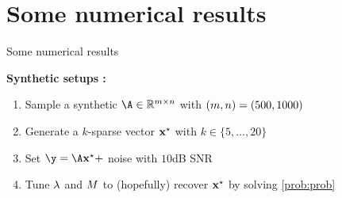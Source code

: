 \documentclass[10pt]{beamer}
\begin{document}
\section{Some numerical results}

\begin{frame}{Some numerical results}
  \newcommand{\CPLEX}{\texttt{CPLEX}}
  \newcommand{\BNB}{\texttt{BnB}}
  \newcommand{\BNBscr}{\texttt{BnB+scr}}
  \newcommand{\sparsitylevel}{k}

  \textbf{Synthetic setups :} 
  \begin{enumerate}
    \item Sample a synthetic $\dic \in \kR^{\ddim\times\pdim}$ with $(m,n)=(500,1000)$ 
    \pause
    \item Generate a $\sparsitylevel$-sparse vector $\mathbf{x}^{\star}$ with $\sparsitylevel \in \{5,\dots,20\}$
    \pause
    \item Set $\obs = \dic \opt{\pv}+$ noise with $10$dB SNR
    \pause
    \item Tune $\lambda$ and $M$ to (hopefully) recover $\mathbf{x}^{\star}$ by solving \eqref{prob:prob}
  \end{enumerate}

  \pause

  \vspace*{0.25cm}
  \begin{figure}
    \centering
    \begin{minipage}[t]{0.49\textwidth}
      
    \end{minipage}
    \hfill
    \pause
    \begin{minipage}[t]{0.49\textwidth}
      
    \end{minipage}
  \end{figure}
\end{frame}
\end{document}

